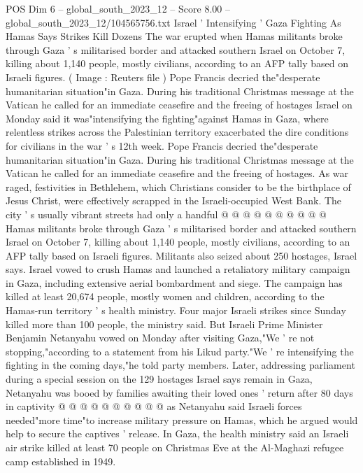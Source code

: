 \begin{textsample}{POS Dim 6 – global\_south\_2023\_12 – Score 8.00 – global\_south\_2023\_12/104565756.txt}  \label{ex:f6_pos_125}
Israel ' Intensifying ' Gaza Fighting As Hamas Says Strikes Kill Dozens The war erupted when Hamas militants broke through Gaza ' s militarised border and attacked southern Israel on October 7, killing about 1,140 people, mostly civilians, according to an AFP tally based on Israeli figures. ( Image : Reuters file ) Pope Francis decried the"desperate humanitarian situation"in Gaza.
During his traditional Christmas message at the Vatican he called for an immediate ceasefire and the freeing of hostages Israel on Monday said it was"intensifying the fighting"against Hamas in Gaza, where relentless strikes across the Palestinian territory exacerbated the dire conditions for civilians in the war ' s 12th week.
Pope Francis decried the"desperate humanitarian situation"in Gaza.
During his traditional Christmas message at the Vatican he called for an immediate ceasefire and the freeing of hostages.
As war raged, festivities in Bethlehem, which Christians consider to be the birthplace of Jesus Christ, were effectively scrapped in the Israeli-occupied West Bank.
The city ' s usually vibrant streets had only a handful @ @ @ @ @ @ @ @ @ @ Hamas militants broke through Gaza ' s militarised border and attacked southern Israel on October 7, killing about 1,140 people, mostly civilians, according to an AFP tally based on Israeli figures.
Militants also seized about 250 hostages, Israel says.
Israel vowed to crush Hamas and launched a retaliatory military campaign in Gaza, including extensive aerial bombardment and siege.
The campaign has killed at least 20,674 people, mostly women and children, according to the Hamas-run territory ' s health ministry.
Four major Israeli strikes since Sunday killed more than 100 people, the ministry said.
But Israeli Prime Minister Benjamin Netanyahu vowed on Monday after visiting Gaza,"We ' re not stopping,"according to a statement from his Likud party."We ' re intensifying the fighting in the coming days,"he told party members.
Later, addressing parliament during a special session on the 129 hostages Israel says remain in Gaza, Netanyahu was booed by families awaiting their loved ones ' return after 80 days in captivity @ @ @ @ @ @ @ @ @ @ as Netanyahu said Israeli forces needed"more time"to increase military pressure on Hamas, which he argued would help to secure the captives ' release.
In Gaza, the health ministry said an Israeli air strike killed at least 70 people on Christmas Eve at the Al-Maghazi refugee camp established in 1949.

\end{textsample}
